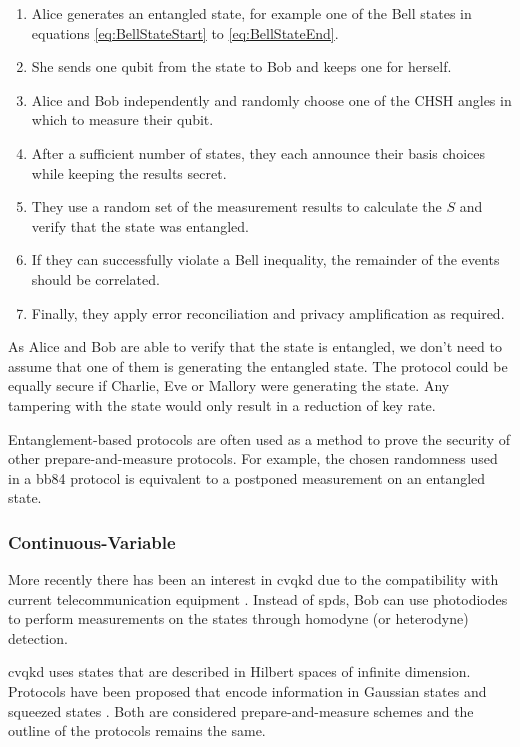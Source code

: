\begin{algorithm}[Ekert 1991]
\begin{enumerate}
	\item Alice generates an entangled state, for example one of the Bell states in equations \ref{eq:BellStateStart} to \ref{eq:BellStateEnd}.
	\item She sends one qubit from the state to Bob and keeps one for herself.
	\item Alice and Bob independently and randomly choose one of the CHSH angles \cite{CHSH} in which to measure their qubit.
	\item After a sufficient number of states, they each announce their basis choices while keeping the results secret.
	\item They use a random set of the measurement results to calculate the $S$ and verify that the state was entangled.
	\item If they can successfully violate a Bell inequality, the remainder of the events should be correlated.
	\item Finally, they apply error reconciliation and privacy amplification as required.
\end{enumerate}
\end{algorithm}

As Alice and Bob are able to verify that the state is entangled, we don't need to assume that one of them is generating the entangled state. The protocol could be equally secure if Charlie, Eve or Mallory were generating the state. Any tampering with the state would only result in a reduction of key rate.

Entanglement-based protocols are often used as a method to prove the security of other prepare-and-measure protocols. For example, the chosen randomness used in a \ac{bb84} protocol is equivalent to a postponed measurement on an entangled state.

\subsubsection{Continuous-Variable}

More recently there has been an interest in \ac{cvqkd} due to the compatibility with current telecommunication equipment \cite{laudenbach2018continuous}. Instead of \acp{spd}, Bob can use photodiodes to perform measurements on the states through homodyne (or heterodyne) detection. 

\Ac{cvqkd} uses states that are described in Hilbert spaces of infinite dimension. Protocols have been proposed that encode information in Gaussian states \cite{Ralph1999} and squeezed states \cite{Hillery2000Quantum}. Both are considered prepare-and-measure schemes and the outline of the protocols remains the same.

